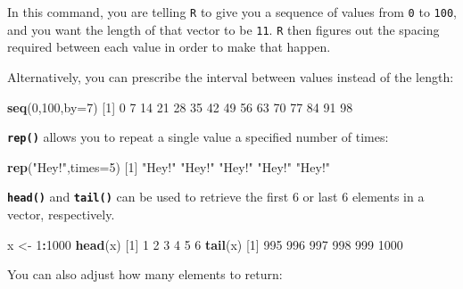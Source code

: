 \documentclass[
]{book}
\newenvironment{Shaded}{\begin{snugshade}}{\end{snugshade}}
\newcommand{\DataTypeTok}[1]{\textcolor[rgb]{0.13,0.29,0.53}{#1}}
\newcommand{\DecValTok}[1]{\textcolor[rgb]{0.00,0.00,0.81}{#1}}
\newcommand{\KeywordTok}[1]{\textcolor[rgb]{0.13,0.29,0.53}{\textbf{#1}}}
\newcommand{\NormalTok}[1]{#1}
\newcommand{\OperatorTok}[1]{\textcolor[rgb]{0.81,0.36,0.00}{\textbf{#1}}}
\newcommand{\StringTok}[1]{\textcolor[rgb]{0.31,0.60,0.02}{#1}}
\begin{document}
In this command, you are telling \texttt{R} to give you a sequence of values from \texttt{0} to \texttt{100}, and you want the length of that vector to be \texttt{11}. \texttt{R} then figures out the spacing required between each value in order to make that happen.

Alternatively, you can prescribe the interval between values instead of the length:

\begin{Shaded}
\begin{Highlighting}[]
\KeywordTok{seq}\NormalTok{(}\DecValTok{0}\NormalTok{,}\DecValTok{100}\NormalTok{,}\DataTypeTok{by=}\DecValTok{7}\NormalTok{)}
\NormalTok{ [}\DecValTok{1}\NormalTok{]  }\DecValTok{0}  \DecValTok{7} \DecValTok{14} \DecValTok{21} \DecValTok{28} \DecValTok{35} \DecValTok{42} \DecValTok{49} \DecValTok{56} \DecValTok{63} \DecValTok{70} \DecValTok{77} \DecValTok{84} \DecValTok{91} \DecValTok{98}
\end{Highlighting}
\end{Shaded}

\textbf{\texttt{rep()}} allows you to repeat a single value a specified number of times:

\begin{Shaded}
\begin{Highlighting}[]
\KeywordTok{rep}\NormalTok{(}\StringTok{"Hey!"}\NormalTok{,}\DataTypeTok{times=}\DecValTok{5}\NormalTok{)}
\NormalTok{[}\DecValTok{1}\NormalTok{] }\StringTok{"Hey!"} \StringTok{"Hey!"} \StringTok{"Hey!"} \StringTok{"Hey!"} \StringTok{"Hey!"}
\end{Highlighting}
\end{Shaded}

\textbf{\texttt{head()}} and \textbf{\texttt{tail()}} can be used to retrieve the first 6 or last 6 elements in a vector, respectively.

\begin{Shaded}
\begin{Highlighting}[]
\NormalTok{x <-}\StringTok{ }\DecValTok{1}\OperatorTok{:}\DecValTok{1000}
\KeywordTok{head}\NormalTok{(x)}
\NormalTok{[}\DecValTok{1}\NormalTok{] }\DecValTok{1} \DecValTok{2} \DecValTok{3} \DecValTok{4} \DecValTok{5} \DecValTok{6}
\KeywordTok{tail}\NormalTok{(x)}
\NormalTok{[}\DecValTok{1}\NormalTok{]  }\DecValTok{995}  \DecValTok{996}  \DecValTok{997}  \DecValTok{998}  \DecValTok{999} \DecValTok{1000}
\end{Highlighting}
\end{Shaded}

You can also adjust how many elements to return:
\end{document}
